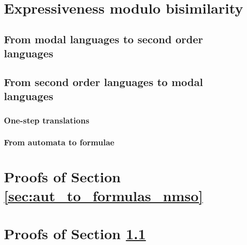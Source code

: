 \documentclass[prodmode,acmtecs]{acmsmall} %
\begin{document}




\clearpage

\section{Expressiveness modulo bisimilarity}\label{sec:expresso}

\subsection{From modal languages to second order languages}\label{subsec:mltwoso}

\subsection{From second order languages to modal languages}



\subsubsection{One-step translations}\label{pinvariant-fragment}


\subsubsection{From automata to formulae}\label{aut-to-formula}







\clearpage


\appendix

\section{Proofs of Section \ref{sec:aut_to_formulas_nmso}}\label{app:nmso-aut-to-formulas}


\section{Proofs of Section \ref{subsec:mltwoso}}\label{app:ML2SO}


\end{document}
